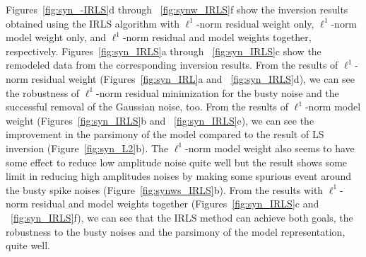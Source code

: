 Figures~\ref{fig:syn_-IRLS}d through ~\ref{fig:synw_IRLS}f show the inversion results 
obtained using the IRLS algorithm with $\ell^1$-norm residual weight only, 
$\ell^1$-norm model weight only, and $\ell^1$-norm residual and model weights together, respectively.  
Figures~\ref{fig:syn_IRLS}a through ~\ref{fig:syn_IRLS}c show the remodeled data 
from the corresponding inversion results.
From the results of $\ell^1$-norm residual weight (Figures~\ref{fig:syn_IRL}a and ~\ref{fig:syn_IRLS}d),
we can see the robustness of $\ell^1$-norm residual minimization for the busty noise
and the successful removal of the Gaussian noise, too.
From the results of $\ell^1$-norm model weight (Figures~\ref{fig:syn_IRLS}b and ~\ref{fig:syn_IRLS}e),
we can see the improvement in the parsimony of the model compared 
to the result of LS inversion (Figure~\ref{fig:syn_L2}b).
The $\ell^1$-norm model weight also seems to have some effect to reduce low amplitude noise quite well
but the result shows some limit in reducing high amplitudes noises by making some spurious event around
the busty spike noises (Figure~\ref{fig:synws_IRLS}b).
From the results with $\ell^1$-norm residual and model weights together 
(Figures~\ref{fig:syn_IRLS}c and ~\ref{fig:syn_IRLS}f),
we can see that the IRLS method can achieve both goals, the robustness to the busty noises
and the parsimony of the model representation, quite well.

